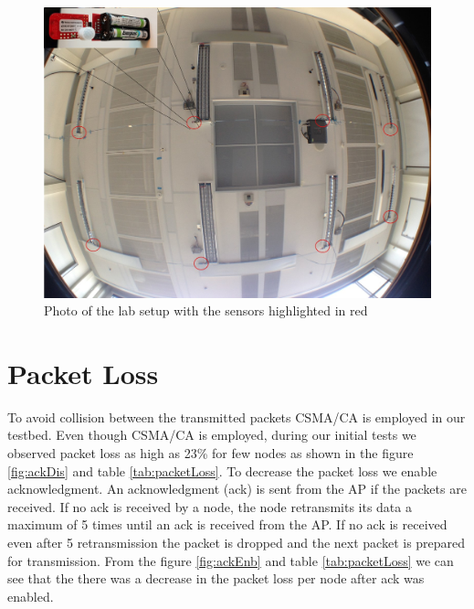 \begin{figure}[!ht]
\includegraphics[scale=0.5]{./pics/lab_photo.jpg}
\caption{Photo of the lab setup with the sensors highlighted in red}
\label{fig:photo}
\end{figure}

\section{Packet Loss}
To avoid collision between the transmitted packets CSMA/CA is employed in our testbed. Even though CSMA/CA is employed, during our initial tests we observed packet loss as high as 23\% for few nodes as shown in the figure \ref{fig:ackDis} and table \ref{tab:packetLoss}. To decrease the packet loss we enable acknowledgment. An acknowledgment (ack) is sent from the AP if the packets are received. If no ack is received by a node, the node retransmits its data a maximum of 5 times until an ack is  received from the AP. If no ack is received even after 5 retransmission the packet is dropped and the next packet is prepared for transmission. From the figure \ref{fig:ackEnb} and table \ref{tab:packetLoss} we can see that the there was a decrease in the packet loss per node after ack was enabled. 

